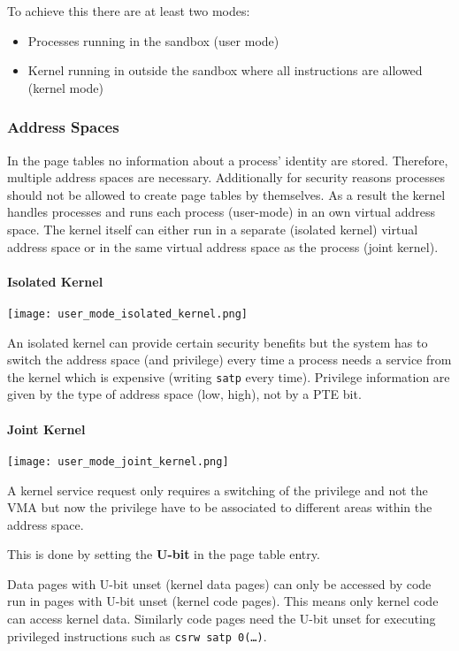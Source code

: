 To achieve this there are at least two modes:
\begin{itemize}
    \item Processes running in the sandbox (user mode)
    \item Kernel running in outside the sandbox where all instructions are allowed (kernel mode)
\end{itemize}

\subsubsection{Address Spaces}
In the page tables no information about a process' identity are stored. Therefore, multiple address spaces are necessary. Additionally for security reasons processes should not be allowed to create page tables by themselves. As a result the kernel handles processes and runs each process (user-mode) in an own virtual address space. The kernel itself can either run in a separate (isolated kernel) virtual address space or in the same virtual address space as the process (joint kernel).

\paragraph{Isolated Kernel}

\texttt{[image: user\_mode\_isolated\_kernel.png]}

An isolated kernel can provide certain security benefits but the system has to switch the address space (and privilege) every time a process needs a service from the kernel which is expensive (writing \texttt{satp} every time). Privilege information are given by the type of address space (low, high), not by a PTE bit.

\paragraph{Joint Kernel}

\texttt{[image: user\_mode\_joint\_kernel.png]}

A kernel service request only requires a switching of the privilege and not the VMA but now the privilege have to be associated to different areas within the address space. 

\newpar{}

This is done by setting the \textbf{U-bit} in the page table entry.

Data pages with U-bit unset (kernel data pages) can only be accessed by code run in pages with U-bit unset (kernel code pages). This means only kernel code can access kernel data. Similarly code pages need the U-bit unset for executing privileged instructions such as \texttt{csrw satp 0(\dots)}.

